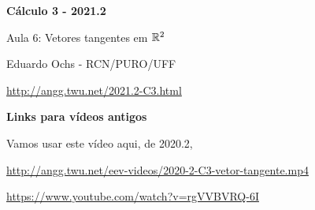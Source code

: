 \documentclass[oneside,12pt]{article}
\begin{document}



\def\drafturl{http://angg.twu.net/LATEX/2021-2-C3.pdf}
\def\drafturl{http://angg.twu.net/2021.2-C3.html}
\def\draftfooter{\tiny \href{\drafturl}{\jobname{}} \ColorBrown{\shorttoday{} \hours}}



%

\thispagestyle{empty}

\begin{center}

\vspace*{1.2cm}

{\bf \Large Cálculo 3 - 2021.2}

\bsk

Aula 6: Vetores tangentes em $\mathbb{R}^2$

\bsk

Eduardo Ochs - RCN/PURO/UFF

\url{http://angg.twu.net/2021.2-C3.html}

\end{center}

\newpage


{\bf Links para vídeos antigos}

\msk


Vamos usar este vídeo aqui, de 2020.2,

\ssk

{\footnotesize

\url{http://angg.twu.net/eev-videos/2020-2-C3-vetor-tangente.mp4}

\url{https://www.youtube.com/watch?v=rgVVBVRQ-6I}

}

\msk
\end{document}
